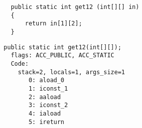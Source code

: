 \begin{lstlisting}
	public static int get12 (int[][] in)
	{
		return in[1][2];
	}
\end{lstlisting}

\begin{lstlisting}
  public static int get12(int[][]);
    flags: ACC_PUBLIC, ACC_STATIC
    Code:
      stack=2, locals=1, args_size=1
         0: aload_0       
         1: iconst_1      
         2: aaload        
         3: iconst_2      
         4: iaload        
         5: ireturn       
\end{lstlisting}

